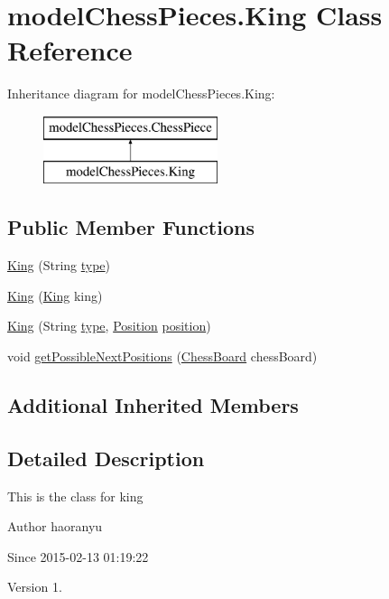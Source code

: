 \hypertarget{classmodel_chess_pieces_1_1_king}{\section{model\+Chess\+Pieces.\+King Class Reference}
\label{classmodel_chess_pieces_1_1_king}
}
Inheritance diagram for model\+Chess\+Pieces.\+King\+:\begin{figure}[H]
\begin{center}
\leavevmode
\includegraphics[height=2.000000cm]{classmodel_chess_pieces_1_1_king}
\end{center}
\end{figure}
\subsection*{Public Member Functions}
\begin{DoxyCompactItemize}
\item 
\hyperlink{classmodel_chess_pieces_1_1_king_addca0068eced10beccbb62407358e10a}{King} (String \hyperlink{classmodel_chess_pieces_1_1_chess_piece_a195487ca88c197af7c1604247be31db2}{type})
\item 
\hyperlink{classmodel_chess_pieces_1_1_king_a0ec90934d337912d33f74cc75547befd}{King} (\hyperlink{classmodel_chess_pieces_1_1_king}{King} king)
\item 
\hyperlink{classmodel_chess_pieces_1_1_king_a304e8f6364f887674d05a98e7a6f3ea1}{King} (String \hyperlink{classmodel_chess_pieces_1_1_chess_piece_a195487ca88c197af7c1604247be31db2}{type}, \hyperlink{classmodel_core_1_1_position}{Position} \hyperlink{classmodel_chess_pieces_1_1_chess_piece_a3d4362d5b28f6edb14161196d9c6807d}{position})
\item 
void \hyperlink{classmodel_chess_pieces_1_1_king_a7437578a623283f0b66e9b2de910fe3f}{get\+Possible\+Next\+Positions} (\hyperlink{classmodel_core_1_1_chess_board}{Chess\+Board} chess\+Board)
\end{DoxyCompactItemize}
\subsection*{Additional Inherited Members}


\subsection{Detailed Description}
This is the class for king \begin{DoxyAuthor}{Author}
haoranyu 
\end{DoxyAuthor}
\begin{DoxySince}{Since}
2015-\/02-\/13 01\+:19\+:22 
\end{DoxySince}
\begin{DoxyVersion}{Version}
1. 
\end{DoxyVersion}


